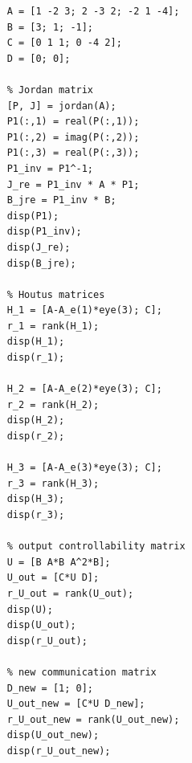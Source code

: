 \documentclass[a4paper, 12pt]{article}
\begin{document}
    
    \begin{lstlisting}[label=task5, caption={Программа для пятого задания}]
    % input data
    A = [1 -2 3; 2 -3 2; -2 1 -4];
    B = [3; 1; -1];
    C = [0 1 1; 0 -4 2];
    D = [0; 0];

    % Jordan matrix
    [P, J] = jordan(A);
    P1(:,1) = real(P(:,1));
    P1(:,2) = imag(P(:,2));
    P1(:,3) = real(P(:,3));
    P1_inv = P1^-1; 
    J_re = P1_inv * A * P1;
    B_jre = P1_inv * B;
    disp(P1);
    disp(P1_inv);
    disp(J_re);
    disp(B_jre);

    % Houtus matrices
    H_1 = [A-A_e(1)*eye(3); C];
    r_1 = rank(H_1);
    disp(H_1);
    disp(r_1);

    H_2 = [A-A_e(2)*eye(3); C];
    r_2 = rank(H_2);
    disp(H_2);
    disp(r_2);

    H_3 = [A-A_e(3)*eye(3); C];
    r_3 = rank(H_3);
    disp(H_3);
    disp(r_3);

    % output controllability matrix
    U = [B A*B A^2*B];
    U_out = [C*U D];
    r_U_out = rank(U_out);
    disp(U);
    disp(U_out);
    disp(r_U_out);

    % new communication matrix
    D_new = [1; 0];
    U_out_new = [C*U D_new];
    r_U_out_new = rank(U_out_new);
    disp(U_out_new);
    disp(r_U_out_new);
    \end{lstlisting}
\end{document}
